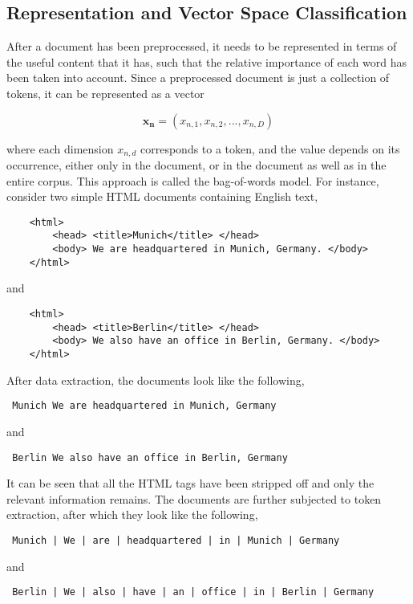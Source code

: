 \subsection{Representation and Vector Space Classification}
After a document has been preprocessed, it needs to be represented in terms of the useful content that it has, such that the relative importance of each word has been taken into account. Since a preprocessed document is just a collection of tokens, it can be represented as a vector

$$\mathbf{x_n} = (x_{n, 1}, x_{n, 2}, ... , x_{n, D})$$

where each dimension $x_{n, d}$ corresponds to a token, and the value depends on its occurrence, either only in the document, or in the document as well as in the entire corpus. This approach is called the bag-of-words model. For instance, consider two simple HTML documents containing English text,

\begin{center}
    \begin{verbatim}
    <html>
        <head> <title>Munich</title> </head>
        <body> We are headquartered in Munich, Germany. </body>
    </html>
    \end{verbatim}
    and
    \begin{verbatim}
    <html>
        <head> <title>Berlin</title> </head>
        <body> We also have an office in Berlin, Germany. </body>
    </html>
    \end{verbatim}
\end{center}

After data extraction, the documents look like the following,

\begin{center}
    \begin{verbatim} Munich We are headquartered in Munich, Germany \end{verbatim}
    and
    \begin{verbatim} Berlin We also have an office in Berlin, Germany \end{verbatim}
\end{center}

It can be seen that all the HTML tags have been stripped off and only the relevant information remains. The documents are further subjected to token extraction, after which they look like the following,

\begin{center}
    \begin{verbatim} Munich | We | are | headquartered | in | Munich | Germany \end{verbatim}
    and
    \begin{verbatim} Berlin | We | also | have | an | office | in | Berlin | Germany \end{verbatim}
\end{center}

